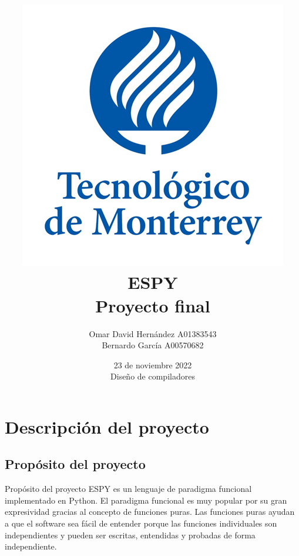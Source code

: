 \documentclass[12pt,letterpaper, titlepage, onecolumn]{article}
\begin{document}
\begin{titlepage}
    \title{\vspace{-5.0cm}\includegraphics{img/logoTec}\\
    {\Huge ESPY} \\
	Proyecto final}    
    
    \author{Omar David Hernández     A01383543
    \\
    Bernardo García     A00570682}
    
    \date {23 de noviembre 2022 \\ Diseño de compiladores}
\end{titlepage}

 
\maketitle

\tableofcontents
\newpage
\justify

\section{Descripción del proyecto}
	\subsection{Propósito del proyecto}
	Propósito del proyecto
	ESPY es un lenguaje de paradigma funcional implementado en Python. 
	El paradigma funcional es muy popular por su gran expresividad gracias al concepto de 
	funciones puras. Las funciones puras ayudan a que el software sea fácil de entender porque 
	las funciones individuales son independientes y pueden ser escritas, entendidas y probadas 
	de forma independiente.
\end{document}
